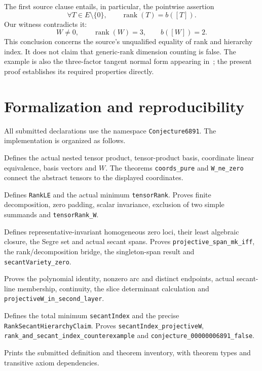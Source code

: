 \documentclass[11pt,a4paper]{article}
\newcommand{\rk}{\operatorname{rank}}
\newcommand{\code}[1]{\nolinkurl{#1}}
\begin{document}
The first source clause entails, in particular, the pointwise assertion
\[
\forall T\in E\setminus\{0\},\qquad \rk(T)=b([T]).
\]
Our witness contradicts it:
\begin{equation}\label{eq:counterexample}
\boxed{W\ne0,\qquad \rk(W)=3,\qquad b([W])=2.}
\end{equation}
This conclusion concerns the source's unqualified equality of rank and hierarchy index. It does not claim that generic-rank dimension counting is false. The example is also the three-factor tangent normal form appearing in~\cite[Proposition~1.1(c)]{landsberg}; the present proof establishes its required properties directly.

\newpage
\section{Formalization and reproducibility}
\small\setlength{\parskip}{4pt}
All submitted declarations use the namespace \code{Conjecture6891}. The implementation is organized as follows.
\begin{description}\raggedright\setlength{\itemsep}{2pt}\setlength{\parsep}{0pt}
\item[\code{Core.lean}] Defines the actual nested tensor product, tensor-product basis, coordinate linear equivalence, basis vectors and $W$. The theorems \code{coords_pure} and \code{W_ne_zero} connect the abstract tensors to the displayed coordinates.
\item[\code{Rank.lean}] Defines \code{RankLE} and the actual minimum \code{tensorRank}. Proves finite decomposition, zero padding, scalar invariance, exclusion of two simple summands and \code{tensorRank_W}.
\item[\code{Projective.lean}] Defines representative-invariant homogeneous zero loci, their least algebraic closure, the Segre set and actual secant spans. Proves \code{projective_span_mk_iff}, the rank/decomposition bridge, the singleton-span result and \code{secantVariety_zero}.
\item[\code{Arc.lean}] Proves the polynomial identity, nonzero arc and distinct endpoints, actual secant-line membership, continuity, the slice determinant calculation and \code{projectiveW_in_second_layer}.
\item[\code{Conjecture6891.lean}] Defines the total minimum \code{secantIndex} and the precise \code{RankSecantHierarchyClaim}. Proves \code{secantIndex_projectiveW}, \code{rank_and_secant_index_counterexample} and \code{conjecture_00000006891_false}.
\item[\code{Check.lean}] Prints the submitted definition and theorem inventory, with theorem types and transitive axiom dependencies.
\end{description}
\end{document}
